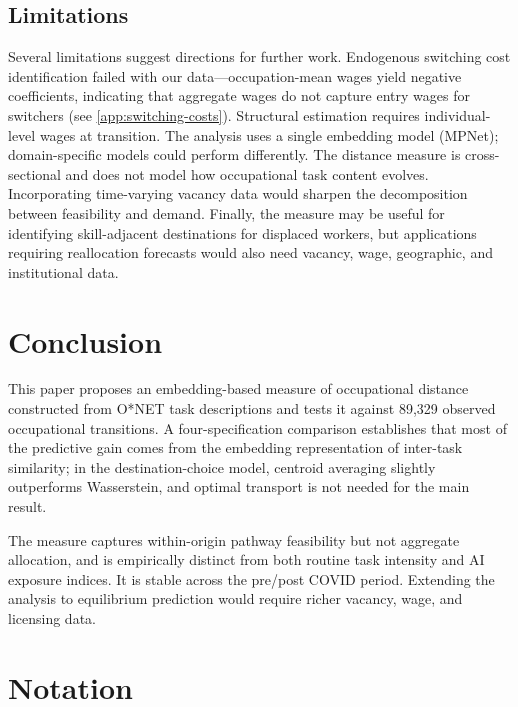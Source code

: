 \documentclass[12pt]{article}
\begin{document}
\subsection{Limitations}

Several limitations suggest directions for further work. Endogenous switching cost identification failed with our data---occupation-mean wages yield negative coefficients, indicating that aggregate wages do not capture entry wages for switchers (see \cref{app:switching-costs}). Structural estimation requires individual-level wages at transition. The analysis uses a single embedding model (MPNet); domain-specific models could perform differently. The distance measure is cross-sectional and does not model how occupational task content evolves. Incorporating time-varying vacancy data would sharpen the decomposition between feasibility and demand. Finally, the measure may be useful for identifying skill-adjacent destinations for displaced workers, but applications requiring reallocation forecasts would also need vacancy, wage, geographic, and institutional data.


\section{Conclusion}
\label{sec:conclusion}


This paper proposes an embedding-based measure of occupational distance constructed from O*NET task descriptions and tests it against 89,329 observed occupational transitions. A four-specification comparison establishes that most of the predictive gain comes from the embedding representation of inter-task similarity; in the destination-choice model, centroid averaging slightly outperforms Wasserstein, and optimal transport is not needed for the main result.

The measure captures within-origin pathway feasibility but not aggregate allocation, and is empirically distinct from both routine task intensity and AI exposure indices. It is stable across the pre/post COVID period. Extending the analysis to equilibrium prediction would require richer vacancy, wage, and licensing data.


\appendix
{}


\section{Notation}
\label{app:formal-definitions}
\end{document}
